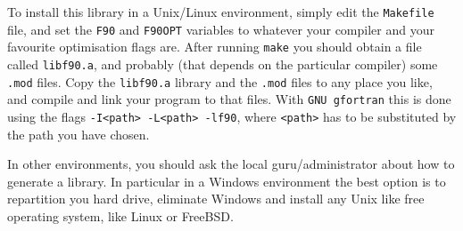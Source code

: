 To install this library in a Unix/Linux environment, simply edit the
\texttt{Makefile} file, and set the \texttt{F90} and \texttt{F90OPT}
variables to whatever your compiler and your favourite optimisation
flags are. After running \texttt{make} you should obtain a file called
\texttt{libf90.a}, and probably (that depends on the particular
compiler) some \texttt{.mod} files. Copy the \texttt{libf90.a} library
and the \texttt{.mod} files to any place you like, and compile and
link your program to that files. With \texttt{GNU gfortran} this is
done using the flags \texttt{-I<path> -L<path> -lf90}, where
\texttt{<path>} has to be substituted by the path you have chosen.

In other environments, you should ask the local guru/administrator
about how to generate a library. In particular in a Windows environment
the best option is to repartition you hard drive, eliminate Windows
and install any Unix like free operating system, like Linux or
FreeBSD. 






 